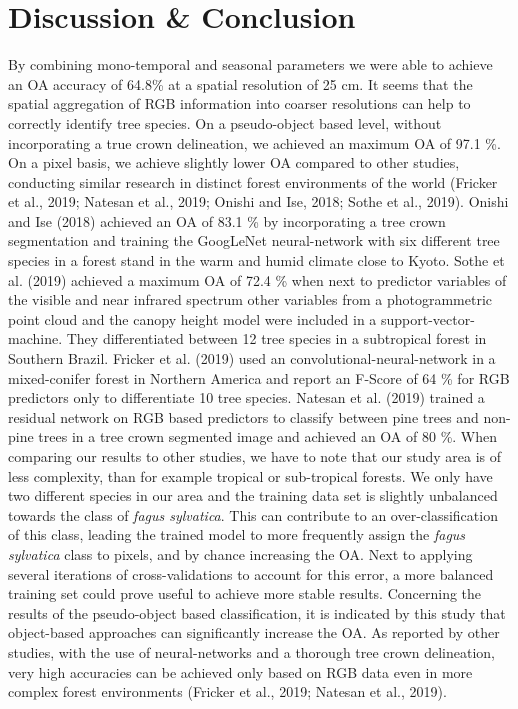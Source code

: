 \documentclass[]{article}
\begin{document}
\hypertarget{discussion-conclusion}{%
\section{Discussion \& Conclusion}\label{discussion-conclusion}}

By combining mono-temporal and seasonal parameters we were able to
achieve an OA accuracy of 64.8\% at a spatial resolution of 25 cm. It
seems that the spatial aggregation of RGB information into coarser
resolutions can help to correctly identify tree species. On a
pseudo-object based level, without incorporating a true crown
delineation, we achieved an maximum OA of 97.1 \%. On a pixel basis, we
achieve slightly lower OA compared to other studies, conducting similar
research in distinct forest environments of the world (Fricker et al.,
2019; Natesan et al., 2019; Onishi and Ise, 2018; Sothe et al., 2019).
Onishi and Ise (2018) achieved an OA of 83.1 \% by incorporating a tree
crown segmentation and training the GoogLeNet neural-network with six
different tree species in a forest stand in the warm and humid climate
close to Kyoto. Sothe et al. (2019) achieved a maximum OA of 72.4 \%
when next to predictor variables of the visible and near infrared
spectrum other variables from a photogrammetric point cloud and the
canopy height model were included in a support-vector-machine. They
differentiated between 12 tree species in a subtropical forest in
Southern Brazil. Fricker et al. (2019) used an
convolutional-neural-network in a mixed-conifer forest in Northern
America and report an F-Score of 64 \% for RGB predictors only to
differentiate 10 tree species. Natesan et al. (2019) trained a residual
network on RGB based predictors to classify between pine trees and
non-pine trees in a tree crown segmented image and achieved an OA of 80
\%. When comparing our results to other studies, we have to note that
our study area is of less complexity, than for example tropical or
sub-tropical forests. We only have two different species in our area and
the training data set is slightly unbalanced towards the class of
\emph{fagus sylvatica}. This can contribute to an over-classification of
this class, leading the trained model to more frequently assign the
\emph{fagus sylvatica} class to pixels, and by chance increasing the OA.
Next to applying several iterations of cross-validations to account for
this error, a more balanced training set could prove useful to achieve
more stable results. Concerning the results of the pseudo-object based
classification, it is indicated by this study that object-based
approaches can significantly increase the OA. As reported by other
studies, with the use of neural-networks and a thorough tree crown
delineation, very high accuracies can be achieved only based on RGB data
even in more complex forest environments (Fricker et al., 2019; Natesan
et al., 2019).
\end{document}
